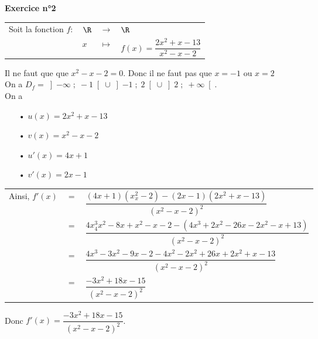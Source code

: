 \newpage

\textbf{Exercice n°2} \\

\begin{tabular}{llll}
Soit la fonction $f :$ & $\R$ & $\longrightarrow$ & $\R$ \\
& $x$ & $\longmapsto$ & $f(x) = \dfrac{2x^2 + x - 13}{x^2 - x - 2} $ \\
\end{tabular}

\vspace*{.3cm}

Il ne faut que que $x^2 - x - 2 = 0$. Donc il ne faut pas que $x = -1$ ou $x=2$ \\ 

On a $D_f = \left]-\infty \; ; \; -1\right[ \cup \left]-1 \; ; \; 2 \right[\cup \left]2 \; ; \; +\infty\right[$. \\

On a

\begin{itemize}
\item[•] $u(x) = 2x^2 + x - 13$
\item[•] $v(x) = x^2 - x - 2$
\item[•] $u'(x) = 4x + 1$
\item[•] $v'(x) = 2x - 1$ 
\end{itemize}


\vspace*{.3cm}

\begin{tabular}{lll}
Ainsi, $f'(x)$ & $=$ & $\dfrac{\left(4x +1\right)\left(x^2 _ x - 2\right)-\left(2x - 1\right)\left(2x^2 + x - 13\right)}{\left(x^2 - x - 2\right)^2}$ \vspace*{.3cm} \\
& $=$ & $\dfrac{4x^3 _ 4x^2 - 8x + x^2 -x - 2-\left(4x^3 + 2x^2 - 26x - 2x^2 -x + 13\right)}{\left(x^2 - x - 2\right)^2}$ \vspace*{.3cm} \\
& $=$ & $\dfrac{4x^3 - 3x^2 - 9x - 2 - 4x^2 - 2x^2 + 26x + 2x^2 + x - 13}{\left(x^2 - x -2\right)^2}$ \vspace*{.3cm} \\
& $=$ & $\dfrac{-3x^2 + 18x - 15}{\left(x^2 - x - 2\right)^2}$ \vspace*{.3cm} \\ 
\end{tabular}

Donc $f'(x) = \dfrac{-3x^2 + 18x - 15}{\left(x^2 - x - 2\right)^2}$. 

